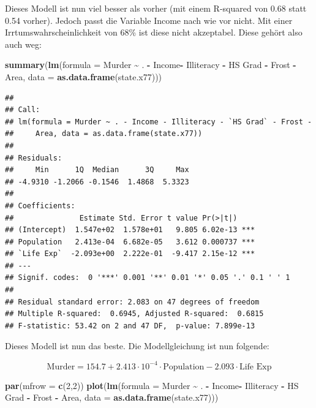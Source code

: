 \documentclass[
]{article}
\newenvironment{Shaded}{\begin{snugshade}}{\end{snugshade}}
\newcommand{\AttributeTok}[1]{\textcolor[rgb]{0.13,0.29,0.53}{#1}}
\newcommand{\DecValTok}[1]{\textcolor[rgb]{0.00,0.00,0.81}{#1}}
\newcommand{\FunctionTok}[1]{\textcolor[rgb]{0.13,0.29,0.53}{\textbf{#1}}}
\newcommand{\NormalTok}[1]{#1}
\newcommand{\SpecialCharTok}[1]{\textcolor[rgb]{0.81,0.36,0.00}{\textbf{#1}}}
\newcommand{\StringTok}[1]{\textcolor[rgb]{0.31,0.60,0.02}{#1}}
\begin{document}
Dieses Modell ist nun viel besser als vorher (mit einem R-squared von
0.68 statt 0.54 vorher). Jedoch passt die Variable Income nach wie vor
nicht. Mit einer Irrtumswahrscheinlichkeit von 68\% ist diese nicht
akzeptabel. Diese gehört also auch weg:

\begin{Shaded}
\begin{Highlighting}[]
\FunctionTok{summary}\NormalTok{(}\FunctionTok{lm}\NormalTok{(}\AttributeTok{formula =}\NormalTok{ Murder }\SpecialCharTok{\textasciitilde{}}\NormalTok{ . }\SpecialCharTok{{-}}\NormalTok{ Income}\SpecialCharTok{{-}}\NormalTok{ Illiteracy }\SpecialCharTok{{-}} \StringTok{\textasciigrave{}}\AttributeTok{HS Grad}\StringTok{\textasciigrave{}} \SpecialCharTok{{-}}\NormalTok{ Frost }\SpecialCharTok{{-}}\NormalTok{ Area,}
           \AttributeTok{data =} \FunctionTok{as.data.frame}\NormalTok{(state.x77)))}
\end{Highlighting}
\end{Shaded}

\begin{verbatim}
## 
## Call:
## lm(formula = Murder ~ . - Income - Illiteracy - `HS Grad` - Frost - 
##     Area, data = as.data.frame(state.x77))
## 
## Residuals:
##     Min      1Q  Median      3Q     Max 
## -4.9310 -1.2066 -0.1546  1.4868  5.3323 
## 
## Coefficients:
##               Estimate Std. Error t value Pr(>|t|)    
## (Intercept)  1.547e+02  1.578e+01   9.805 6.02e-13 ***
## Population   2.413e-04  6.682e-05   3.612 0.000737 ***
## `Life Exp`  -2.093e+00  2.222e-01  -9.417 2.15e-12 ***
## ---
## Signif. codes:  0 '***' 0.001 '**' 0.01 '*' 0.05 '.' 0.1 ' ' 1
## 
## Residual standard error: 2.083 on 47 degrees of freedom
## Multiple R-squared:  0.6945, Adjusted R-squared:  0.6815 
## F-statistic: 53.42 on 2 and 47 DF,  p-value: 7.899e-13
\end{verbatim}

Dieses Modell ist nun das beste. Die Modellgleichung ist nun folgende:

\[
\text{Murder} = 154.7 + 2.413 \cdot 10^{-4} \cdot \text{Population} - 2.093 \cdot \text{Life Exp}
\]

\begin{Shaded}
\begin{Highlighting}[]
\FunctionTok{par}\NormalTok{(}\AttributeTok{mfrow =} \FunctionTok{c}\NormalTok{(}\DecValTok{2}\NormalTok{,}\DecValTok{2}\NormalTok{))}
\FunctionTok{plot}\NormalTok{(}\FunctionTok{lm}\NormalTok{(}\AttributeTok{formula =}\NormalTok{ Murder }\SpecialCharTok{\textasciitilde{}}\NormalTok{ . }\SpecialCharTok{{-}}\NormalTok{ Income}\SpecialCharTok{{-}}\NormalTok{ Illiteracy }\SpecialCharTok{{-}} \StringTok{\textasciigrave{}}\AttributeTok{HS Grad}\StringTok{\textasciigrave{}} \SpecialCharTok{{-}}\NormalTok{ Frost }\SpecialCharTok{{-}}\NormalTok{ Area,}
           \AttributeTok{data =} \FunctionTok{as.data.frame}\NormalTok{(state.x77)))}
\end{Highlighting}
\end{Shaded}
\end{document}
